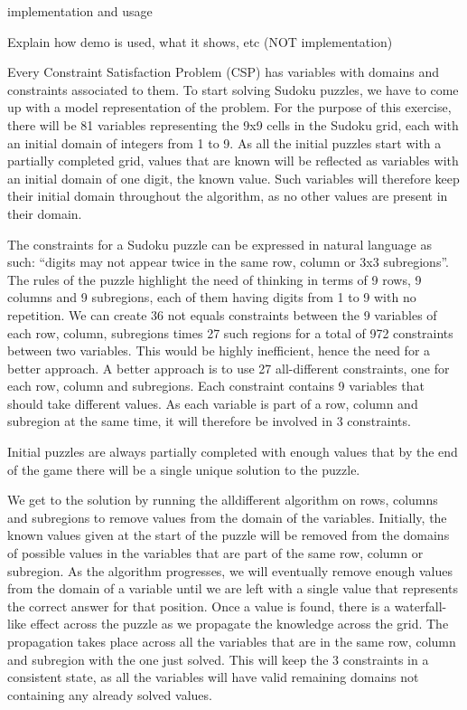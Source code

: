 \documentclass{l4proj}
\begin{document}
\noindent implementation and usage

\noindent Explain how demo is used, what it shows, etc (NOT implementation)

\noindent Every Constraint Satisfaction Problem (CSP) has variables with domains and constraints associated to them. To start solving Sudoku puzzles, we have to come up with a model representation of the problem. For the purpose of this exercise, there will be 81 variables representing the 9x9 cells in the Sudoku grid, each with an initial domain of integers from 1 to 9. As all the initial puzzles start with a partially completed grid, values that are known will be reflected as variables with an initial domain of one digit, the known value. Such variables will therefore keep their initial domain throughout the algorithm, as no other values are present in their domain.

\noindent The constraints for a Sudoku puzzle can be expressed in natural language as such: “digits may not appear twice in the same row, column or 3x3 subregions”. The rules of the puzzle highlight the need of thinking in terms of 9 rows, 9 columns and 9 subregions, each of them having digits from 1 to 9 with no repetition. We can create 36 not equals constraints between the 9 variables of each row, column, subregions times 27 such regions for a total of 972 constraints between two variables. This would be highly inefficient, hence the need for a better approach. A better approach is to use 27 all-different constraints, one for each row, column and subregions. Each constraint contains 9 variables that should take different values. As each variable is part of a row, column and subregion at the same time, it will therefore be involved in 3 constraints.

\noindent Initial puzzles are always partially completed with enough values that by the end of the game there will be a single unique solution to the puzzle. 

\noindent We get to the solution by running the alldifferent algorithm on rows, columns and subregions to remove values from the domain of the variables. Initially, the known values given at the start of the puzzle will be removed from the domains of possible values in the variables that are part of the same row, column or subregion. As the algorithm progresses, we will eventually remove enough values from the domain of a variable until we are left with a single value that represents the correct answer for that position. Once a value is found, there is a waterfall-like effect across the puzzle as we propagate the knowledge across the grid. The propagation takes place across all the variables that are in the same row, column and subregion with the one just solved. This will keep the 3 constraints in a consistent state, as all the variables will have valid remaining domains not containing any already solved values.
\end{document}
